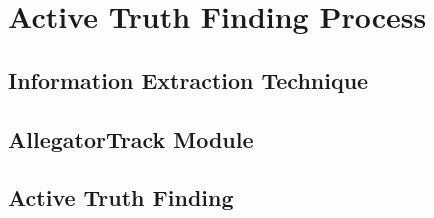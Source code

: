 \section{Active Truth Finding Process}

\subsection{Information Extraction Technique}

\subsection{AllegatorTrack Module}

\subsection{Active Truth Finding}